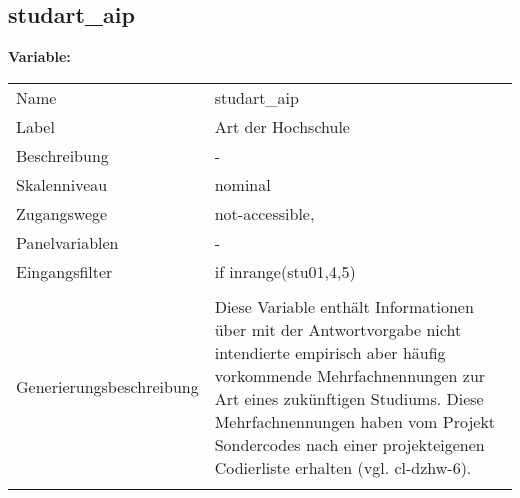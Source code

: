 	
	
	\subsection{studart\_aip}
	\label{subSection:studart_aip}

	\noindent\textbf{Variable:}\\
		\begin{tabular}{lL{11.3cm}}
			\label{tableVariable:studart_aip}
			Name & studart\_aip \\
			Label & Art der Hochschule \\
			Beschreibung & - \\
			Skalenniveau & nominal \\
			Zugangswege &
				not-accessible,
 \\
			Panelvariablen & -
			 \\
			Eingangsfilter & if inrange(stu01,4,5) \\
 \\
					Generierungsbeschreibung & Diese Variable enthält Informationen über mit der Antwortvorgabe nicht intendierte empirisch aber häufig vorkommende Mehrfachnennungen zur Art eines zukünftigen Studiums. Diese Mehrfachnennungen haben vom Projekt Sondercodes nach einer projekteigenen Codierliste erhalten (vgl. cl-dzhw-6).
				 \\	
			 \\
		\end{tabular}






	
	\newpage

